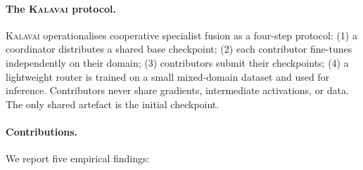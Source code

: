 \documentclass{article}
\newcommand{\kalavai}{\textsc{Kalavai}\xspace}
\begin{document}
\paragraph{The \kalavai protocol.} \kalavai operationalises cooperative specialist fusion as a four-step protocol: (1) a coordinator distributes a shared base checkpoint; (2) each contributor fine-tunes independently on their domain; (3) contributors submit their checkpoints; (4) a lightweight router is trained on a small mixed-domain dataset and used for inference. Contributors never share gradients, intermediate activations, or data. The only shared artefact is the initial checkpoint.

\paragraph{Contributions.} We report five empirical findings:
\end{document}
